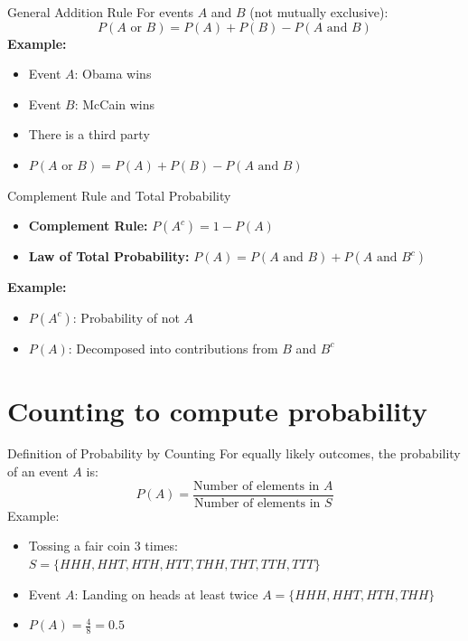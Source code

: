 \documentclass[aspectratio=169]{beamer}
\begin{document}
\begin{frame}{General Addition Rule}
    For events \(A\) and \(B\) (not mutually exclusive):
    \[
    P(A \text{ or } B) = P(A) + P(B) - P(A \text{ and } B)
    \]
    \vspace{0.5cm}
    \textbf{Example:}
    \begin{itemize}
        \item Event \(A\): Obama wins
        \item Event \(B\): McCain wins
        \item There is a third party
        \item \(P(A \text{ or } B) = P(A) + P(B) - P(A \text{ and } B)\)
    \end{itemize}
\end{frame}

\begin{frame}{Complement Rule and Total Probability}
    \begin{itemize}
        \item \textbf{Complement Rule:} \(P(A^c) = 1 - P(A)\)
        \item \textbf{Law of Total Probability:} \(P(A) = P(A \text{ and } B) + P(A \text{ and } B^c)\)
    \end{itemize}
    \vspace{0.5cm}
    \textbf{Example:}
    \begin{itemize}
        \item \(P(A^c)\): Probability of not \(A\)
        \item \(P(A)\): Decomposed into contributions from \(B\) and \(B^c\)
    \end{itemize}
\end{frame}

\section{\large Counting to compute probability}

\begin{frame}{Definition of Probability by Counting}
    For equally likely outcomes, the probability of an event \(A\) is:
    \[
    P(A) = \frac{\text{Number of elements in } A}{\text{Number of elements in } S}
    \]
    Example:
    \begin{itemize}
        \item Tossing a fair coin 3 times: \(S = \{HHH, HHT, HTH, HTT, THH, THT, TTH, TTT\}\)
        \item Event \(A\): Landing on heads at least twice \(A = \{HHH, HHT, HTH, THH\}\)
        \item \(P(A) = \frac{4}{8} = 0.5\)
    \end{itemize}
\end{frame}
\end{document}
